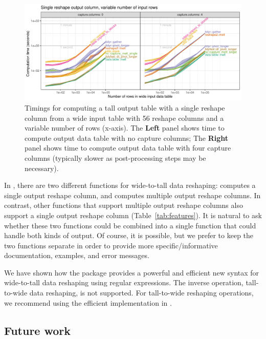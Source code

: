 \begin{figure}
  \centering
  \includegraphics[width = \textwidth]{figure-who-rows-new.pdf}
  \vskip -0.3cm
  \caption{Timings for computing a tall output table with a single
    reshape column from a wide input table with 56 reshape columns and
    a variable number of rows (x-axis). The \textbf{Left} panel shows time
    to compute output data table with no capture columns;
    The \textbf{Right} panel shows time to compute output data table with
    four capture columns (typically slower as post-processing steps
    may be necessary).}
  \label{fig:timings-single-rows}
\end{figure}

In , there are two different functions for wide-to-tall data
reshaping:  computes a single output
reshape column, and  computes
multiple output reshape columns. In contrast, other functions that
support multiple output reshape columns also support a single output
reshape column (Table~\ref{tab:features}). It is natural to ask whether
these two  functions could be combined into a single function
that could handle both kinds of output. Of course, it is possible, but
we prefer to keep the two functions separate in order to provide more
specific/informative documentation, examples, and error messages.

We have shown how the  package provides a powerful and
efficient new syntax for wide-to-tall data reshaping using regular
expressions. The inverse operation, tall-to-wide data reshaping, is
not supported. For tall-to-wide reshaping operations, we recommend
using the efficient implementation in .

\subsection{Future work}

